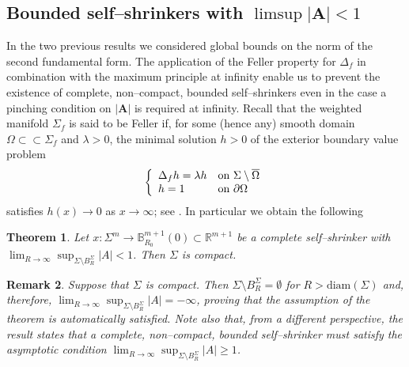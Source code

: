 \documentclass[11pt,leqno]{amsart}\usepackage{amsmath}
\newtheorem{theorem}{Theorem}
\newtheorem{remark}[theorem]{Remark}
\numberwithin{equation}{section}
\begin{document}
\subsection{Bounded self--shrinkers with $\limsup |\mathbf{A}|<1$}
In the two previous results we considered global bounds on the norm of  the second fundamental form. The application of the Feller property for $\Delta_f$ in combination with the maximum principle at infinity enable us to prevent the existence of complete, non--compact, bounded self--shrinkers even in the case a pinching condition on $|\mathbf{A}|$ is required at infinity. Recall that the weighted manifold $\Sigma_f$ is said to be Feller if, for some (hence any) smooth domain $\Omega \subset\subset \Sigma_f$ and $\lambda>0$, the minimal solution $h>0$ of the exterior boundary value problem
\[
\left\{
\begin{array}
[c]{ll}\Delta_f h=\lambda h & \text{on }\Sigma\setminus \overline{\Omega}\\
h=1 & \text{on }\partial\Omega
\end{array}
\right.
\]
satisfies $h(x) \to 0$ as $x \to \infty$; see \cite{PS-JFA, BPS-RevMatIb}. In particular we obtain the following
\begin{theorem}\label{BndAtInf}
Let $x:\Sigma^m\to\mathbb{B}_{R_0}^{m+1}(0)\subset\mathbb{R}^{m+1}$ be a complete self--shrinker with $\lim_{R\to\infty}\sup_{\Sigma\setminus B_{R}^{\Sigma}}|A|<1$. Then $\Sigma$ is compact.
\end{theorem}

\begin{remark}
\rm{
Suppose that $\Sigma$ is compact. Then  $\Sigma\setminus B_{R}^{\Sigma} = \emptyset$ for $R > \mathrm{diam}(\Sigma)$ and, therefore, $\lim_{R\to\infty}\sup_{\Sigma\setminus B_{R}^{\Sigma}}|A|=-\infty$, proving that the assumption of the theorem is automatically satisfied.
Note also that, from a different perspective, the result states that a complete, non--compact, bounded self--shrinker must satisfy the asymptotic condition
$\lim_{R\to\infty}\sup_{\Sigma\setminus B_{R}^{\Sigma}}|A|\geq 1$.
}
\end{remark}
\end{document}
